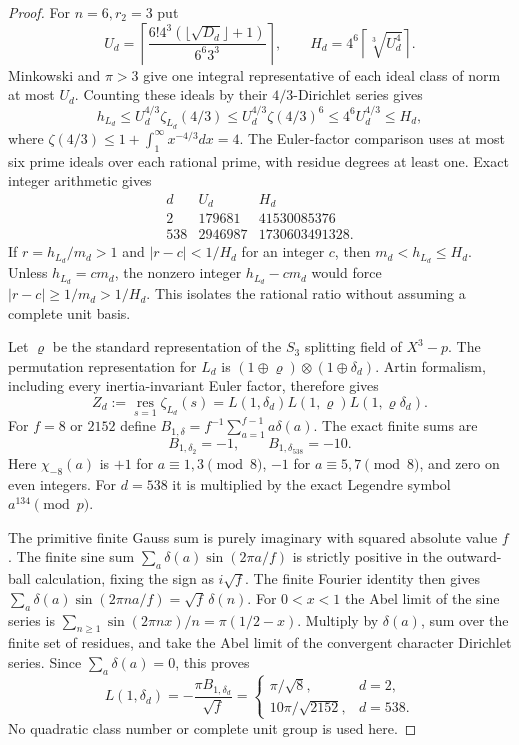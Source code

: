 \begin{proof}
For $n=6,r_2=3$ put
\[
 U_d=\left\lceil\frac{6!4^3(\lfloor\sqrt{D_d}\rfloor+1)}
                            {6^6 3^3}\right\rceil,\qquad
 H_d=4^6\left\lceil\sqrt[3]{U_d^4}\right\rceil.
 \tag{G150C.15}
\]
Minkowski and $\pi>3$ give one integral representative of each
ideal class of norm at most $U_d$.
Counting these ideals by their $4/3$-Dirichlet series gives
\[
 h_{L_d}\le U_d^{4/3}\zeta_{L_d}(4/3)
 \le U_d^{4/3}\zeta(4/3)^6\le4^6 U_d^{4/3}\le H_d,
 \tag{G150C.16}
\]
where $\zeta(4/3)\le1+\int_1^\infty x^{-4/3}dx=4$.
The Euler-factor comparison uses at most six prime ideals over
each rational prime, with residue degrees at least one.
Exact integer arithmetic gives
\[
 \begin{array}{c|r|r}
 d&U_d&H_d\\\hline
 2&179681&41530085376\\
 538&2946987&1730603491328.
 \end{array}
 \tag{G150C.17}
\]
If $r=h_{L_d}/m_d>1$ and $|r-c|<1/H_d$ for an integer $c$,
then $m_d<h_{L_d}\le H_d$.
Unless $h_{L_d}=cm_d$, the nonzero integer $h_{L_d}-cm_d$
would force $|r-c|\ge1/m_d>1/H_d$.
This isolates the rational ratio without assuming a complete unit basis.

Let $\varrho$ be the standard representation of the $S_3$
splitting field of $X^3-p$.
The permutation representation for $L_d$ is
$(1\oplus\varrho)\otimes(1\oplus\delta_d)$.
Artin formalism, including every inertia-invariant Euler factor,
therefore gives
\[
 Z_d:=\operatorname*{res}_{s=1}\zeta_{L_d}(s)
       =L(1,\delta_d)L(1,\varrho)L(1,\varrho\delta_d).
 \tag{G150C.18}
\]
For $f=8$ or $2152$ define
$B_{1,\delta}=f^{-1}\sum_{a=1}^{f-1}a\delta(a)$.
The exact finite sums are
\[
 B_{1,\delta_2}=-1,\qquad B_{1,\delta_{538}}=-10.
 \tag{G150C.19}
\]
Here $\chi_{-8}(a)$ is $+1$ for $a\equiv1,3\pmod8$,
$-1$ for $a\equiv5,7\pmod8$, and zero on even integers.
For $d=538$ it is multiplied by the exact Legendre symbol
$a^{134}\pmod p$.

The primitive finite Gauss sum is purely imaginary with squared
absolute value $f$.  The finite sine sum
$\sum_a\delta(a)\sin(2\pi a/f)$ is strictly positive in the
outward-ball calculation, fixing the sign as $i\sqrt f$.
The finite Fourier identity then gives
$\sum_a\delta(a)\sin(2\pi na/f)=\sqrt f\,\delta(n)$.
For $0<x<1$ the Abel limit of the sine series is
$\sum_{n\ge1}\sin(2\pi nx)/n=\pi(1/2-x)$.
Multiply by $\delta(a)$, sum over the finite set of residues,
and take the Abel limit of the convergent character Dirichlet series.
Since $\sum_a\delta(a)=0$, this proves
\[
 L(1,\delta_d)=-\frac{\pi B_{1,\delta_d}}{\sqrt f}
 =\begin{cases}\pi/\sqrt8,&d=2,\\10\pi/\sqrt{2152},&d=538.
 \end{cases}
 \tag{G150C.20}
\]
No quadratic class number or complete unit group is used here.


\end{proof}
